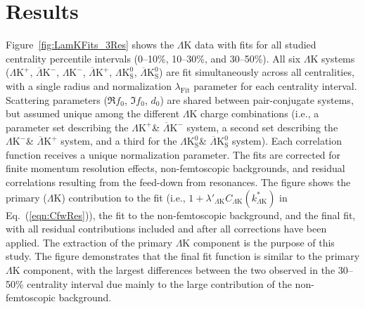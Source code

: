 \documentclass[ALICE,manyauthors]{cernphprep}
\newcommand{\LamK}{$\Lambda$K\xspace}
\newcommand{\LamKchP}{$\Lambda\mathrm{K^{+}}$\xspace}
\newcommand{\ALamKchM}{$\overline{\Lambda}\mathrm{K^{-}}$\xspace}
\newcommand{\LamKchM}{$\Lambda\mathrm{K^{-}}$\xspace}
\newcommand{\ALamKchP}{$\overline{\Lambda}\mathrm{K^{+}}$\xspace}
\newcommand{\LamKs}{$\Lambda\mathrm{K^{0}_{S}}$\xspace}
\newcommand{\ALamKs}{$\overline{\Lambda}\mathrm{K^{0}_{S}}$\xspace}
\begin{document}
\begin{table}[htbp]
{\begin{tabular}{l|r}
  \end{tabular}
 \label{tab:LamKSystematics} 
 }
\end{table}



\section{Results}
\label{sec:Results}

Figure~\ref{fig:LamKFits_3Res} shows the \LamK data with fits for all studied centrality percentile intervals (0--10\%, 10--30\%, and 30--50\%). 
All six \LamK systems (\LamKchP, \ALamKchM, \LamKchM, \ALamKchP, \LamKs, \ALamKs) are fit simultaneously across all centralities, with a single radius and normalization $\lambda_{\mathrm{Fit}}$ parameter for each centrality interval. 
{\color{red}Scattering parameters ($\Re f_{0}$, $\Im f_{0}$, $d_{0}$) are shared between pair-conjugate systems, but assumed unique among the different \LamK charge combinations (i.e., a parameter set describing the \LamKchP \& \ALamKchM system, a second set describing the \LamKchM \& \ALamKchP system, and a third for the \LamKs \& \ALamKs system).
Each correlation function receives a unique normalization parameter.
The fits are corrected for finite momentum resolution effects, non-femtoscopic backgrounds, and residual correlations resulting from the feed-down from resonances.}
The figure shows the primary (\LamK) contribution to the fit (i.e., $1 + \lambda'_{\Lambda\mathrm{K}}C_{\Lambda\mathrm{K}}(k^{*}_{\Lambda\mathrm{K}})$ in Eq.~{\color{blue}(}\ref{eqn:CfwRes}{\color{blue})}), the fit to the non-femtoscopic background, and the final fit, with all residual contributions included and after all corrections have been applied.
The extraction of the primary \LamK component is the purpose of this study.
The figure demonstrates that the final fit function is similar to the primary \LamK component, with the largest differences between the two observed in the 30--50\% centrality interval due mainly to the large contribution of the non-femtoscopic background.
\end{document}
